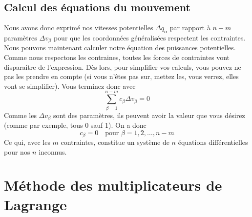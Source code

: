 \subsection{Calcul des équations du mouvement}
Nous avons donc exprimé nos vitesses potentielles $\Delta q_\alpha$ par rapport à $n - m$ paramètres $\Delta v_\beta$ pour que les coordonnées généralisées respectent les contraintes.
Nous pouvons maintenant calculer notre équation des puissances potentielles.
Comme nous respectons les contraines, toutes les forces de contraintes vont disparaitre de l'expression.
Dès lors, pour simplifier vos calculs, vous pouvez ne pas les prendre en compte (si vous n'êtes pas sur, mettez les, vous verrez, elles vont se simplifier).
Vous terminez donc avec
\[ \sum_{\beta = 1}^{n - m} c_\beta \Delta v_\beta = 0 \]
Comme les $\Delta v_\beta$ sont des paramètres, ils peuvent avoir la valeur que vous désirez
(comme par exemple, tous 0 sauf 1).
On a donc
\[ c_\beta = 0 \quad \text{pour }\beta = 1, 2, \ldots, n-m \]
Ce qui, avec les $m$ contraintes, constitue un système de $n$ équations différentielles pour nos $n$ inconnus.

\section{Méthode des multiplicateurs de Lagrange}

